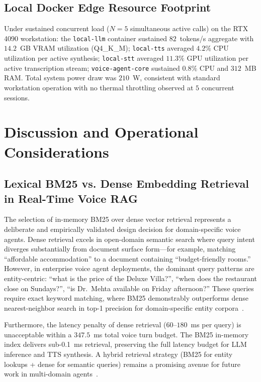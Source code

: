 \documentclass[11pt,a4paper]{article}
\begin{document}
\subsection{Local Docker Edge Resource Footprint}
\label{subsec:eval_resource}

Under sustained concurrent load ($N=5$ simultaneous active calls) on the RTX 4090 workstation: the \texttt{local-llm} container sustained $82$~tokens/s aggregate with $14.2$~GB VRAM utilization (Q4\_K\_M); \texttt{local-tts} averaged $4.2\%$ CPU utilization per active synthesis; \texttt{local-stt} averaged $11.3\%$ GPU utilization per active transcription stream; \texttt{voice-agent-core} sustained $0.8\%$ CPU and $312$~MB RAM. Total system power draw was $210$~W, consistent with standard workstation operation with no thermal throttling observed at $5$ concurrent sessions.

\section{Discussion and Operational Considerations}
\label{sec:discussion}

\subsection{Lexical BM25 vs. Dense Embedding Retrieval in Real-Time Voice RAG}
\label{subsec:disc_bm25}

The selection of in-memory BM25 over dense vector retrieval represents a deliberate and empirically validated design decision for domain-specific voice agents. Dense retrieval excels in open-domain semantic search where query intent diverges substantially from document surface form---for example, matching ``affordable accommodation'' to a document containing ``budget-friendly rooms.'' However, in enterprise voice agent deployments, the dominant query patterns are entity-centric: ``what is the price of the Deluxe Villa?'', ``when does the restaurant close on Sundays?'', ``is Dr.\ Mehta available on Friday afternoon?'' These queries require exact keyword matching, where BM25 demonstrably outperforms dense nearest-neighbor search in top-1 precision for domain-specific entity corpora~\cite{robertson2009probabilistic}.

Furthermore, the latency penalty of dense retrieval ($60$--$180$~ms per query) is unacceptable within a $347.5$~ms total voice turn budget. The BM25 in-memory index delivers sub-0.1~ms retrieval, preserving the full latency budget for LLM inference and TTS synthesis. A hybrid retrieval strategy (BM25 for entity lookups + dense for semantic queries) remains a promising avenue for future work in multi-domain agents~\cite{izacard2022unsupervised}.
\end{document}
